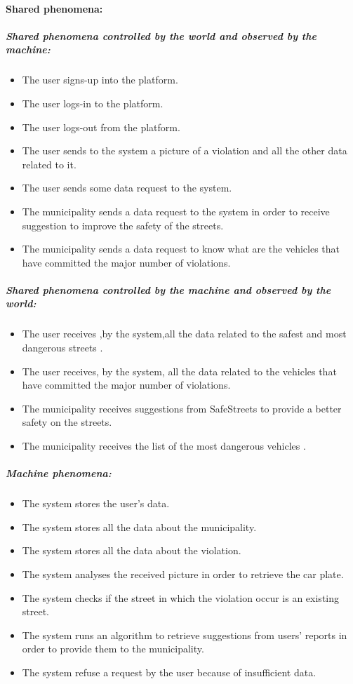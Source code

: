 \documentclass[titlepage]{article}
\begin{document}
\paragraph{Shared phenomena: }
\subparagraph{Shared phenomena controlled by the world and observed by the machine: }
\begin{itemize}
    \item The user signs-up into the platform.
    \item The user logs-in to the platform.
    \item The user logs-out from the platform.
 	\item The user sends to the system a picture of a            	violation and all the other data related to it.
 	\item The user sends some data request to the system.
	\item The municipality sends a data request to the system 		  in order to receive suggestion to improve the 				  safety 	of the streets.
	\item The municipality sends a data request to know what 			  are the vehicles that have committed the major 				  number of violations.
\end{itemize}
\subparagraph{Shared phenomena controlled by the machine and  			observed by the world: }
\begin{itemize}
	\item The user receives ,by the system,all the data 			related to the safest and most dangerous streets .
	\item The user receives, by the system, all the data related to the vehicles that have committed the major number of violations.
	\item The municipality receives suggestions from SafeStreets to provide a better 			safety on the streets.
	\item The municipality receives the list of the most 			dangerous vehicles .
	
\end{itemize}
\subparagraph{Machine phenomena: }
\begin{itemize}
	\item The system stores the user's data.
	\item The system stores all the data about the 					municipality.
	\item The system stores all the data about the violation.
	\item The system analyses the received picture in order to 	retrieve the car plate.
	\item The system checks if the street in which the 				violation occur is an existing street.
	\item The system runs an algorithm to retrieve suggestions from users' reports in order to provide them to the municipality.
	\item The system refuse a request by the user because of 
	insufficient data.
\end{itemize}
\end{document}
